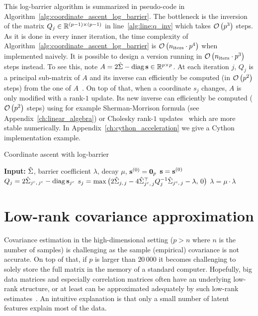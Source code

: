 \bigbreak
This log-barrier algorithm is summarized in pseudo-code in Algorithm~\ref{alg:coordinate_ascent_log_barrier}.
The bottleneck is the inversion of the matrix
$Q_j \in \mathbb{R}^{(p - 1) \times (p - 1)}$ in line~\ref{alg:line:q_inv} which takes $\mathcal{O}\left( p^3 \right)$ steps.
As it is done in every inner iteration, the time complexity of Algorithm~\ref{alg:coordinate_ascent_log_barrier} is
$\mathcal{O}\left( n_\text{iters} \cdot p^4 \right)$ when implemented naively.
It is possible to design a version running in $\mathcal{O}\left( n_\text{iters} \cdot p^3 \right)$ steps instead.
To see this, note $A = 2\hat{\Sigma} - \operatorname*{diag}\mathbf{s} \in \mathbb{R}^{p \times p}$.
At each iteration $j$, $Q_j$ is a principal sub-matrix of $A$ and its inverse can efficiently be computed
(in $\mathcal{O}\left( p^2 \right)$ steps) from the one of $A$~\citep{submatrix_inverse}.
On top of that, when a coordinate $s_j$ changes,
$A$ is only modified with a rank-$1$ update.
Its new inverse can efficiently be computed ($\mathcal{O}\left( p^2 \right)$ steps)
using for example Sherman-Morrison formula
(see Appendix~\ref{ch:linear_algebra})
or Cholesky rank-$1$ updates~\citep{cholesky_rank_1} which are more stable numerically.
In Appendix~\ref{ch:cython_acceleration} we give a Cython implementation example.
\begin{algorithm}[t]
    \caption{Coordinate ascent with log-barrier}\label{alg:coordinate_ascent_log_barrier}
    \begin{algorithmic}[1]
        \State \textbf{Input:} $\hat{\Sigma}$, barrier coefficient $\lambda$, decay $\mu$, $\mathbf{s}^{(0)} = \mathbf{0}_p$
        \State $\mathbf{s} = \mathbf{s}^{(0)}$
        \Repeat
        \State $Q_j = 2\hat{\Sigma}_{j^c,\, j^c} - \operatorname*{diag}\mathbf{s}_{j^c}$
        \State $s_j = \max\big( 2\hat{\Sigma}_{j,\, j} - 4\hat{\Sigma}_{j^c,\, j}^\top Q_j^{-1} \hat{\Sigma}_{j^c,\, j} - \lambda,\, 0 \big)$\label{alg:line:q_inv}
        \EndFor
        \State $\lambda = \mu \cdot \lambda$
    \end{algorithmic}
\end{algorithm}

\section{Low-rank covariance approximation}\label{sec:low_rank_sigma}

Covariance estimation in the high-dimensional setting ($p > n$ where $n$ is the number of samples)
is challenging as the sample (empirical) covariance is not accurate.
On top of that,
if $p$ is larger than $20\,000$ it becomes challenging to solely store the full matrix in the memory
of a standard computer.
Hopefully, big data matrices and especially correlation matrices often have an underlying low-rank structure,
or at least can be approximated adequately by such low-rank estimates~\citep{big_data_low_rank}.
An intuitive explanation is that only a small number of latent features explain most of the data.

